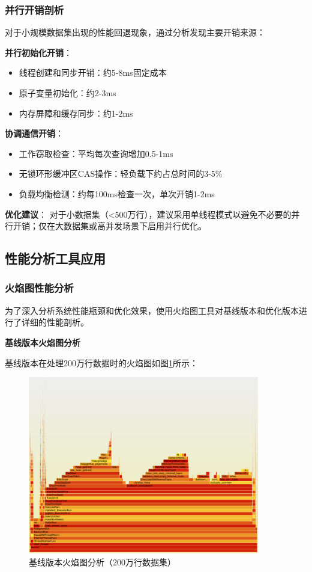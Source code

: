 \subsubsection{并行开销剖析}

对于小规模数据集出现的性能回退现象，通过分析发现主要开销来源：

\textbf{并行初始化开销}：
\begin{itemize}
    \item 线程创建和同步开销：约5-8ms固定成本
    \item 原子变量初始化：约2-3ms
    \item 内存屏障和缓存同步：约1-2ms
\end{itemize}

\textbf{协调通信开销}：
\begin{itemize}
    \item 工作窃取检查：平均每次查询增加0.5-1ms
    \item 无锁环形缓冲区CAS操作：轻负载下约占总时间的3-5\%
    \item 负载均衡检测：约每100ms检查一次，单次开销1-2ms
\end{itemize}

\textbf{优化建议}：
对于小数据集（<500万行），建议采用单线程模式以避免不必要的并行开销；仅在大数据集或高并发场景下启用并行优化。

\subsection{性能分析工具应用}

\subsubsection{火焰图性能分析}

为了深入分析系统性能瓶颈和优化效果，使用火焰图工具对基线版本和优化版本进行了详细的性能剖析。

\textbf{基线版本火焰图分析}

基线版本在处理200万行数据时的火焰图如图\ref{fig:baseline_flamegraph}所示：

\begin{figure}[htbp]
\centering
\includegraphics[width=0.9\textwidth]{assets/testdata_baseline/baseline火焰图.jpg}
\caption{基线版本火焰图分析（200万行数据集）}
\label{fig:baseline_flamegraph}
\end{figure}

